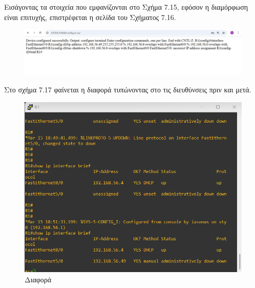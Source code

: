 \FloatBarrier

\noindent Εισάγοντας τα στοιχεία που εμφανίζονται στο Σχήμα 7.15, εφόσον η διαμόρφωση είναι επιτυχής, επιστρέφεται η σελίδα  του Σχήματος 7.16.

\FloatBarrier

\begin{figure}[h]
	\centering
	\includegraphics[width=1.0\textwidth]{graphics/configure_ip_1.png}
	\caption{}
\end{figure}

\FloatBarrier

\noindent Στο σχήμα 7.17 φαίνεται η διαφορά τυπώνοντας στο  τις  διευθύνσεις πριν και μετά.

\FloatBarrier

\begin{figure}[h]
	\centering
	\includegraphics[width=1.0\textwidth]{graphics/ip_difference.png}
	\caption{ Διαφορά}
\end{figure}

\FloatBarrier